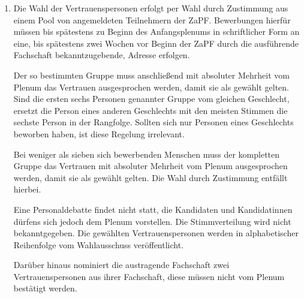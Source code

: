 \documentclass[draft,12pt,oneside]{scrreprt}
\begin{document}
\begin{enumerate}
  \item Die Wahl der Vertrauenspersonen erfolgt per Wahl durch
        Zustimmung aus einem Pool von angemeldeten Teilnehmern der ZaPF.
        Bewerbungen hierfür müssen bis spätestens zu Beginn des Anfangsplenums
        in schriftlicher Form an eine, bis spätestens zwei Wochen vor Beginn der
        ZaPF durch die ausführende Fachschaft bekanntzugebende, Adresse erfolgen.

        Der so bestimmten Gruppe muss anschließend mit absoluter Mehrheit vom
        Plenum das Vertrauen ausgesprochen werden, damit sie als gewählt gelten.
        Sind die ersten sechs Personen genannter Gruppe vom gleichen Geschlecht,
        ersetzt die Person eines anderen Geschlechts mit den meisten Stimmen die
        sechste Person in der Rangfolge.
        Sollten sich nur Personen eines Geschlechts beworben haben, ist diese
        Regelung irrelevant.

        Bei weniger als sieben sich bewerbenden Menschen muss der kompletten Gruppe
        das Vertrauen mit absoluter Mehrheit vom Plenum ausgesprochen werden,
        damit sie als gewählt gelten.
        Die Wahl durch Zustimmung entfällt hierbei.

        Eine Personaldebatte findet nicht statt, die Kandidaten und Kandidatinnen
        dürfens sich jedoch dem Plenum vorstellen.
        Die Stimmverteilung wird nicht bekanntgegeben.
        Die gewählten Vertrauenspersonen werden in alphabetischer Reihenfolge
        vom Wahlausschuss veröffentlicht.

        Darüber hinaus nominiert die austragende Fachschaft zwei Vertrauenspersonen
        aus ihrer Fachschaft, diese müssen nicht vom Plenum bestätigt werden.


\end{enumerate}
\end{document}
